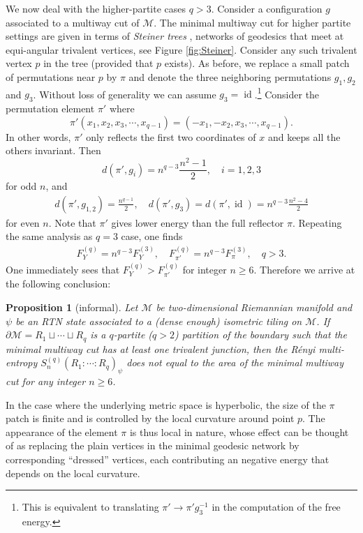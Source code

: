 \documentclass[11pt,oneside,letterpaper]{article}
\numberwithin{equation}{section}
\newtheorem{proposition}[theorem]{Proposition}
\theoremstyle{definition}
\theoremstyle{remark}
\DeclareMathOperator{\id}{id}
\begin{document}
We now deal with the higher-partite cases $q>3$. Consider a configuration $g$ associated to a multiway cut of $\mathcal{M}$. The minimal multiway cut for higher partite settings are given in terms of \emph{Steiner trees} \cite{5a25f51b-2e25-3c6f-9c0a-0a63d8e9f411}, networks of geodesics that meet at equi-angular trivalent vertices, see Figure \ref{fig:Steiner}.
Consider any such trivalent vertex $p$ in the tree (provided that $p$ exists).
As before, we replace a small patch of permutations near $p$ by $\pi$ and denote the three neighboring permutations $g_1,g_2$ and $g_3$. Without loss of generality we can assume $g_3=\id$.\footnote{This is equivalent to translating $\pi'\to \pi' g_3^{-1}$ in the computation of the free energy.} Consider the permutation element $\pi'$ where
\begin{equation}
    \pi'(x_1,x_2,x_3,\cdots,x_{q-1})=(-x_1,-x_2,x_3,\cdots,x_{q-1}).
\end{equation}
In other words, $\pi'$ only reflects the first two coordinates of $x$ and keeps all the others invariant. Then
\begin{equation}
    d(\pi',g_i)=n^{q-3}\frac{n^2-1}{2}, \quad{i=1,2,3}
\end{equation}
for odd $n$, and
\begin{align}
    d(\pi',g_{1,2})=\frac{n^{q-1}}{2},
    \quad d(\pi',g_3)=d(\pi',\id)=n^{q-3}\frac{n^2-4}{2}
\end{align}
for even $n$. Note that $\pi'$ gives lower energy than the full reflector $\pi$. Repeating the same analysis as $q=3$ case, one finds
\begin{align}
    F^{(q)}_Y = n^{q-3}F^{(3)}_Y, \quad F^{(q)}_{\pi'} = n^{q-3}F^{(3)}_\pi, \quad q>3.
\end{align}
One immediately sees that $F^{(q)}_Y>F^{(q)}_{\pi'}$ for integer $n\ge 6$.
Therefore we arrive at the following conclusion:
\begin{proposition}[informal]
  Let $\mathcal{M}$ be two-dimensional Riemannian manifold and $\psi$ be an RTN state associated to a (dense enough) isometric tiling on $\mathcal{M}$.
  If $\partial \mathcal{M} = R_1 \sqcup \cdots \sqcup R_q$ is a $q$-partite ($q>2$) partition of the boundary such that the minimal multiway cut has at least one trivalent junction, then the R\'enyi multi-entropy $S^{(q)}_n(R_1:\cdots:R_q)_\psi$ does \emph{not} equal to the area of the minimal multiway cut for any integer $n\ge 6$.
\end{proposition}

In the case where the underlying metric space is hyperbolic, the size of the $\pi$ patch is finite and is controlled by the local curvature around point $p$. The appearance of the element $\pi$ is thus local in nature, whose effect can be thought of as replacing the plain vertices in the minimal geodesic network by corresponding ``dressed''  vertices, each contributing an negative energy that depends on the local curvature.
\end{document}
